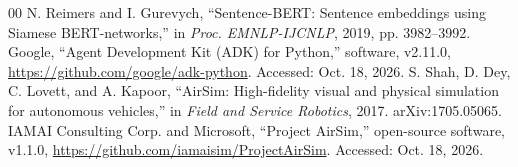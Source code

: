 \documentclass[conference]{IEEEtran}
\begin{document}
\begin{thebibliography}{00}
 N. Reimers and I. Gurevych, ``Sentence-BERT: Sentence embeddings using Siamese BERT-networks,'' in \emph{Proc. EMNLP-IJCNLP}, 2019, pp. 3982--3992.
 Google, ``Agent Development Kit (ADK) for Python,'' software, v2.11.0, \url{https://github.com/google/adk-python}. Accessed: Oct. 18, 2026.
 S. Shah, D. Dey, C. Lovett, and A. Kapoor, ``AirSim: High-fidelity visual and physical simulation for autonomous vehicles,'' in \emph{Field and Service Robotics}, 2017. arXiv:1705.05065.
 IAMAI Consulting Corp. and Microsoft, ``Project AirSim,'' open-source software, v1.1.0, \url{https://github.com/iamaisim/ProjectAirSim}. Accessed: Oct. 18, 2026.
\end{thebibliography}
\end{document}
